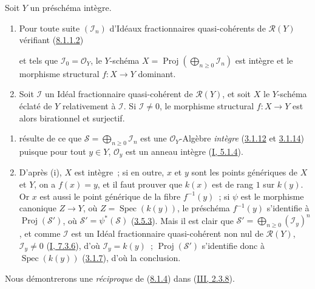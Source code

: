 \begin{proposition}[8.1.4]
\label{II.8.1.4-fr}
Soit $Y$ un préschéma intègre.
\begin{enumerate}
\item[\rm(i)] Pour toute suite $(\mathcal{I}_n)$ d'Idéaux fractionnaires
quasi-cohérents de $\mathcal{R}(Y)$ vérifiant
(\hyperref[II.8.1.1.2-fr]{8.1.1.2})

et tels que $\mathcal{I}_0=\mathcal{O}_Y$, le $Y$-schéma
$X=\operatorname{Proj}(\bigoplus_{n\geq0}\mathcal{I}_n)$ est intègre et le
morphisme structural $f:X\to Y$ dominant.
\item[\rm(ii)] Soit $\mathcal{I}$ un Idéal fractionnaire quasi-cohérent de
$\mathcal{R}(Y)$, et soit $X$ le $Y$-schéma éclaté de $Y$ relativement à
$\mathcal{I}$. Si $\mathcal{I}\neq0$, le morphisme structural $f:X\to Y$ est
alors birationnel et surjectif.
\end{enumerate}
\end{proposition}

\begin{enumerate}
\item[\rm(i)] résulte de ce que $\mathcal{S}=\bigoplus_{n\geq0}\mathcal{I}_n$
est une $\mathcal{O}_Y$-Algèbre \emph{intègre}
(\hyperref[II.3.1.12-fr]{3.1.12} et \hyperref[II.3.1.14-fr]{3.1.14}) puisque
pour tout $y\in Y$, $\mathcal{O}_y$ est un anneau intègre
(\hyperref[I.5.1.4-fr]{I, 5.1.4}).
\item[\rm(ii)] D'après (i), $X$ est intègre~; si en outre, $x$ et $y$ sont les
points génériques de $X$ et $Y$, on a $f(x)=y$, et il faut prouver que $k(x)$
est de rang $1$ sur $k(y)$. Or $x$ est aussi le point générique de la fibre
$f^{-1}(y)$~; si $\psi$ est le morphisme canonique $Z\to Y$, où
$Z=\operatorname{Spec}(k(y))$, le préschéma $f^{-1}(y)$ s'identifie à
$\operatorname{Proj}(\mathcal{S}')$, où
$\mathcal{S}'=\psi^*(\mathcal{S})$ (\hyperref[II.3.5.3-fr]{3.5.3}). Mais il est
clair que $\mathcal{S}'=\bigoplus_{n\geq0}(\mathcal{I}_y)^n$, et comme
$\mathcal{I}$ est un Idéal fractionnaire quasi-cohérent non nul de
$\mathcal{R}(Y)$, $\mathcal{I}_y\neq0$
(\hyperref[I.7.3.6-fr]{I, 7.3.6}), d'où $\mathcal{I}_y=k(y)$~;
$\operatorname{Proj}(\mathcal{S}')$ s'identifie donc à
$\operatorname{Spec}(k(y))$ (\hyperref[II.3.1.7-fr]{3.1.7}), d'où la
conclusion.
\end{enumerate}

Nous démontrerons une \emph{réciproque} de
(\hyperref[II.8.1.4-fr]{8.1.4}) dans
(\hyperref[III.2.3.8-fr]{III, 2.3.8}).

